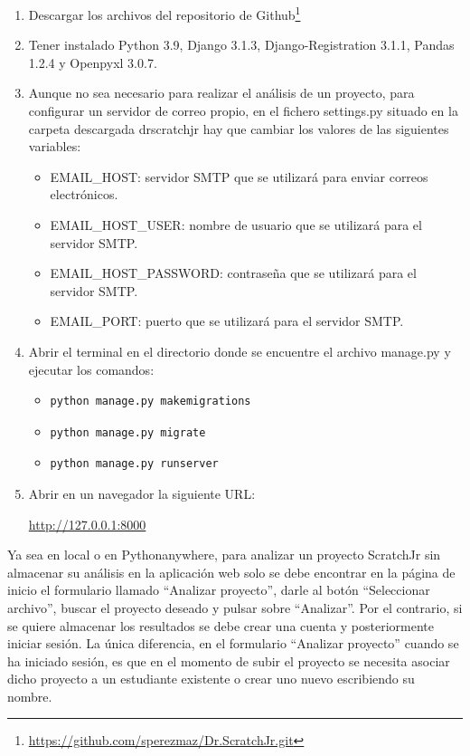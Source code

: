 \documentclass[a4paper, 12pt]{book}
\begin{document}
\begin{enumerate}
    \item Descargar los archivos del repositorio de Github\footnote{\url{https://github.com/sperezmaz/Dr.ScratchJr.git}}
    \item Tener instalado Python 3.9, Django 3.1.3, Django-Registration 3.1.1, Pandas 1.2.4 y Openpyxl 3.0.7.
    \item Aunque no sea necesario para realizar el análisis de un proyecto, para configurar un servidor de correo propio, en el fichero settings.py situado en la carpeta descargada drscratchjr hay que cambiar los valores de las siguientes variables:
        \begin{itemize}
            \item EMAIL\_HOST: servidor SMTP que se utilizará para enviar correos electrónicos.
            \item EMAIL\_HOST\_USER: nombre de usuario que se utilizará para el servidor SMTP.
            \item EMAIL\_HOST\_PASSWORD: contraseña que se utilizará para el servidor SMTP.
            \item EMAIL\_PORT: puerto que se utilizará para el servidor SMTP.
        \end{itemize}
    \item Abrir el terminal en el directorio donde se encuentre el archivo manage.py y ejecutar los comandos:
        \begin{itemize}
            \item \begin{verbatim}python manage.py makemigrations\end{verbatim}
            \item \begin{verbatim}python manage.py migrate\end{verbatim}
            \item \begin{verbatim}python manage.py runserver\end{verbatim}
        \end{itemize}
    \item Abrir en un navegador la siguiente URL:
    \begin{center}
        \url{http://127.0.0.1:8000}
    \end{center}
    
\end{enumerate}

Ya sea en local o en Pythonanywhere, para analizar un proyecto ScratchJr sin almacenar su análisis en la aplicación web solo se debe encontrar en la página de inicio el formulario llamado ``Analizar proyecto'', darle al botón ``Seleccionar archivo'', buscar el proyecto deseado y pulsar sobre ``Analizar''.
Por el contrario, si se quiere almacenar los resultados se debe crear una cuenta y posteriormente iniciar sesión.
La única diferencia, en el formulario ``Analizar proyecto'' cuando se ha iniciado sesión, es que en el momento de subir el proyecto se necesita asociar dicho proyecto a un estudiante existente o crear uno nuevo escribiendo su nombre.
\end{document}
